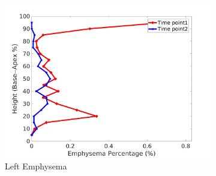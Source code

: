 \begin{figure}[H]
\begin{subfigure}{.42\linewidth}
  \includegraphics[width=\linewidth,trim={{.0\wd0} {.0\wd0} {.0\wd0} {.0\wd0}},clip]{Appendix/Image_AppexA/BaseToApex/IPF14LeftLungEmphysemaDiseaseAgainstHeight.jpg} %
  \caption{Left Emphysema}
  \label{fig:IPF14DiseaseAgainstHeight-g} 
\end{subfigure} 
\begin{subfigure}{.42\linewidth}%

\end{subfigure}
\end{figure}
